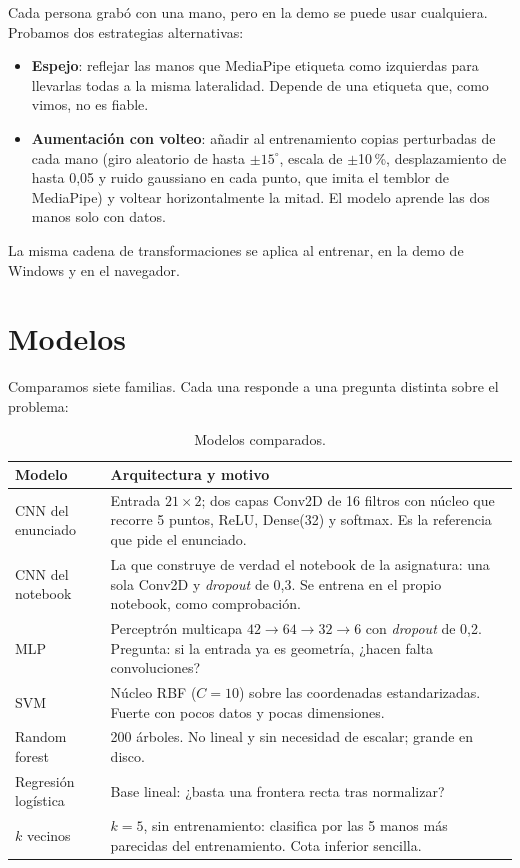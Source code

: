 \documentclass[11pt,a4paper]{article}
\newcommand{\pct}[1]{#1\,\%}
\begin{document}
Cada persona grabó con una mano, pero en la demo se puede usar cualquiera. Probamos dos estrategias alternativas:

\begin{itemize}
  \item \textbf{Espejo}: reflejar las manos que MediaPipe etiqueta como izquierdas para llevarlas todas a la misma
        lateralidad. Depende de una etiqueta que, como vimos, no es fiable.
  \item \textbf{Aumentación con volteo}: añadir al entrenamiento copias perturbadas de cada mano (giro aleatorio de
        hasta $\pm15^\circ$, escala de $\pm$\pct{10}, desplazamiento de hasta 0,05 y ruido gaussiano en cada punto,
        que imita el temblor de MediaPipe) y voltear horizontalmente la mitad. El modelo aprende las dos manos solo con
        datos.
\end{itemize}

La misma cadena de transformaciones se aplica al entrenar, en la demo de Windows y en el navegador.

\section{Modelos}

Comparamos siete familias. Cada una responde a una pregunta distinta sobre el problema:

\begin{table}[H]
\centering\small
\begin{tabularx}{\linewidth}{lX}
\toprule
Modelo & Arquitectura y motivo \\
\midrule
CNN del enunciado & Entrada $21\times2$; dos capas Conv2D de 16 filtros con núcleo que recorre 5 puntos, ReLU, Dense(32) y
softmax. Es la referencia que pide el enunciado. \\
CNN del notebook & La que construye de verdad el notebook de la asignatura: una sola Conv2D y \emph{dropout} de 0,3.
Se entrena en el propio notebook, como comprobación. \\
MLP & Perceptrón multicapa $42 \rightarrow 64 \rightarrow 32 \rightarrow 6$ con \emph{dropout} de 0,2. Pregunta: si la
entrada ya es geometría, ¿hacen falta convoluciones? \\
SVM & Núcleo RBF ($C=10$) sobre las coordenadas estandarizadas. Fuerte con pocos datos y pocas dimensiones. \\
Random forest & 200 árboles. No lineal y sin necesidad de escalar; grande en disco. \\
Regresión logística & Base lineal: ¿basta una frontera recta tras normalizar? \\
$k$ vecinos & $k=5$, sin entrenamiento: clasifica por las 5 manos más parecidas del entrenamiento. Cota inferior sencilla. \\
\bottomrule
\end{tabularx}
\caption{Modelos comparados.}
\end{table}
\end{document}
